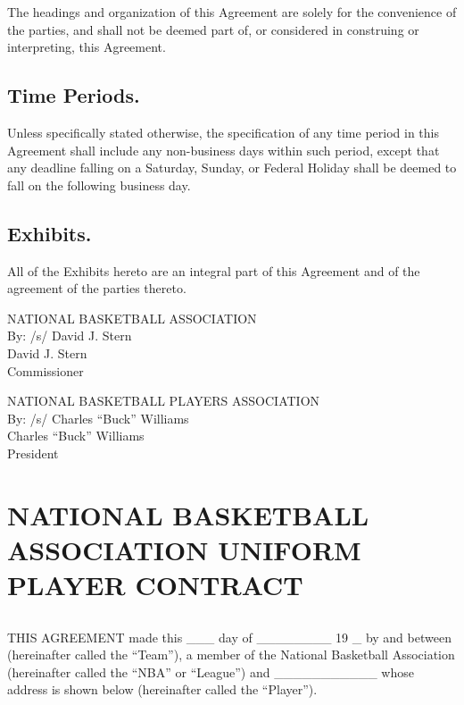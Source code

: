 \documentclass[
]{book}
\begin{document}
The headings and organization of this Agreement are solely for the convenience of the parties, and shall not be deemed part of, or considered in construing or interpreting, this Agreement.

\hypertarget{time-periods.}{%
\section{Time Periods.}\label{time-periods.}}

Unless specifically stated otherwise, the specification of any time period in this Agreement shall include any non-business days within such period, except that any deadline falling on a Saturday, Sunday, or Federal Holiday shall be deemed to fall on the following business day.

\hypertarget{exhibits.}{%
\section{Exhibits.}\label{exhibits.}}

All of the Exhibits hereto are an integral part of this Agreement and of the agreement of the parties thereto.

NATIONAL BASKETBALL ASSOCIATION\\
By: /s/ David J. Stern\\
David J. Stern\\
Commissioner

NATIONAL BASKETBALL PLAYERS ASSOCIATION\\
By: /s/ Charles ``Buck'' Williams\\
Charles ``Buck'' Williams\\
President

\hypertarget{appendix-appendix}{%
\appendix}


\hypertarget{national-basketball-association-uniform-player-contract}{%
\chapter{NATIONAL BASKETBALL ASSOCIATION UNIFORM PLAYER CONTRACT}\label{national-basketball-association-uniform-player-contract}}

\hypertarget{section}{%
\section{}\label{section}}

THIS AGREEMENT made this \_\_\_ day of \_\_\_\_\_\_\_\_ 19 \_ by and between (hereinafter called the ``Team''), a member of the National Basketball Association (hereinafter called the ``NBA'' or ``League'') and \_\_\_\_\_\_\_\_\_\_\_ whose address is shown below (hereinafter called the ``Player'').
\end{document}
